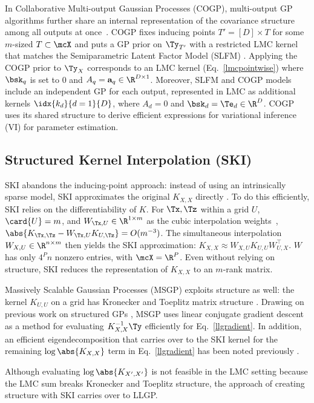 \documentclass[twoside]{article}
\begin{document}
In Collaborative Multi-output Gaussian Processes (COGP), multi-output GP algorithms further share an internal representation of the covariance structure among all outputs at once~\citep{nguyen2014collaborative}. COGP fixes inducing points ${T'}=[D]\times T$ for some $m$-sized $T\subset \mcX$ and puts a GP prior on $\Ty_{{T'}}$ with a restricted LMC kernel that matches the Semiparametric Latent Factor Model (SLFM) \citep{seeger2005semiparametric}. Applying the COGP prior to $\Ty_X$ corresponds to an LMC kernel (Eq.~\ref{lmcpointwise}) where $\bsk_q$ is set to 0 and $A_q=\textbf{a}_q\in\R^{D\times 1}$. Moreover, SLFM and COGP models include an independent GP for each output, represented in LMC as additional kernels $\idx{k_d}{d=1}{D}$, where $A_d=0$ and $\bsk_d=\Te_d\in\R^D$. COGP uses its shared structure to derive efficient expressions for variational inference (VI) for parameter estimation.

\subsection{Structured Kernel Interpolation (SKI)}\label{ski-section}

SKI abandons the inducing-point approach: instead of using an intrinsically sparse model, SKI approximates the original $K_{X,X}$ directly \citep{kiss-gp}. To do this efficiently, SKI relies on the differentiability of $K$. For $\Tx,\Tz$ within a grid $U$, $\card{U}=m$, and $W_{\Tx,U}\in\R^{1\times m}$ as the cubic interpolation weights~\citep{keys1981cubic}, $\abs{K_{\Tx,\Tz}-W_{\Tx,U}K_{U,\Tz}}=O(m^{-3})$. The simultaneous interpolation $W_{X,U}\in\R^{n\times m}$ then yields the SKI approximation: $K_{X,X}\approx W_{X,U}K_{U,U}W_{U,X}^\top$. $W$ has only $4^Pn$ nonzero entries, with $\mcX=\R^P$. Even without relying on structure, SKI reduces the representation of $K_{X,X}$ to an $m$-rank matrix.

Massively Scalable Gaussian Processes (MSGP) exploits structure as well: the kernel $K_{U,U}$ on a grid has Kronecker and Toeplitz matrix structure \citep{msgp}. Drawing on previous work on structured GPs \citep{cunningham2008fast, gilboa2015scaling}, MSGP uses linear conjugate gradient descent as a method for evaluating $K_{X,X}^{-1}\Ty$ efficiently for Eq.~\ref{llgradient}. In addition, an efficient eigendecomposition that carries over to the SKI kernel for the remaining $\log\abs{K_{X,X}}$ term in Eq.~\ref{llgradient} has been noted previously \citep{wilson2014fast}.

Although evaluating $\log\abs{K_{X',X'}}$ is not feasible in the LMC setting because the LMC sum breaks Kronecker and Toeplitz structure, the approach of creating structure with SKI carries over to LLGP.
\end{document}
